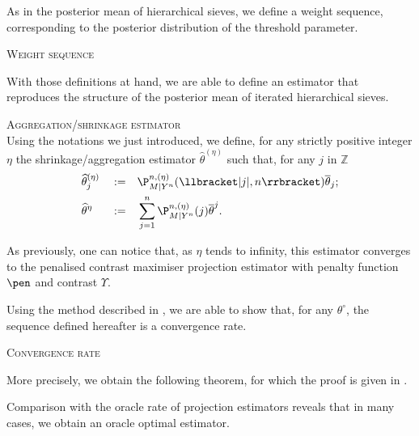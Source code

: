 As in the posterior mean of hierarchical sieves, we define a weight sequence, corresponding to the posterior distribution of the threshold parameter.

\begin{de}{\textsc{Weight sequence} \\}\label{DE_FREQ_CIRCDECONV_KNOWN_BETA_WEIGHT}
\end{de}

With those definitions at hand, we are able to define an estimator that reproduces the structure of the posterior mean of iterated hierarchical sieves.

\begin{de}{\textsc{Aggregation/shrinkage estimator} \\}\label{DE_FREQ_CIRCDECONV_KNOWN_BETA_AGGREGEST}
Using the notations we just introduced, we define, for any strictly positive integer $\eta$ the shrinkage/aggregation estimator $\widehat{\theta}^{(\eta)}$ such that, for any $j$ in $\mathds{Z}$
\begin{alignat*}{3}
& \widehat{\theta}^{(\eta)}_{j} && := && \P_{M \vert Y^{n}}^{n, (\eta)}(\llbracket \vert j \vert, n \rrbracket) \overline{\theta}_{j};\\
& \widehat{\theta}^{\eta} && := && \sum\limits_{j = 1}^{n} \P_{M \vert Y^{n}}^{n, (\eta)}(j) \overline{\theta}^{j}.
\end{alignat*}
\end{de}

As previously, one can notice that, as $\eta$ tends to infinity, this estimator converges to the penalised contrast maximiser projection estimator with penalty function $\pen$ and contrast $\Upsilon$.

\medskip

Using the method described in , we are able to show that, for any $\theta^{\circ}$, the sequence defined hereafter is a convergence rate.

\begin{de}{\textsc{Convergence rate} \\}\label{DE_FREQ_CIRCDECONV_KNOWN_BETA_CONVRATE}
\end{de}

More precisely, we obtain the following theorem, for which the proof is given in .

\begin{thm}\label{THM_FREQ_CIRCDECONV_KNOWN_BETA_ORACLE_NP}
\end{thm}

Comparison with the oracle rate of projection estimators reveals that in many cases, we obtain an oracle optimal estimator.

\begin{il}\label{IL_FREQ_CIRCDECONV_KNOWN_BETA_RATE}
\end{il}